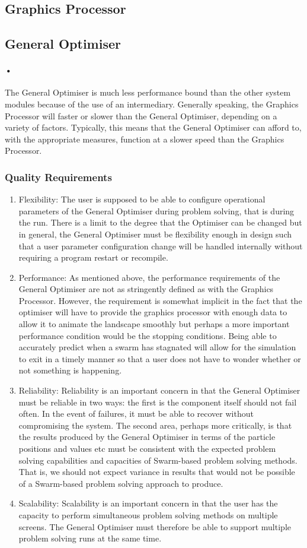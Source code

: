 \documentclass[11pt]{article}
\begin{document}
\subsection{Graphics Processor}
\subsection{General Optimiser}
\paragraph{•}
The General Optimiser is much less performance bound than the other system modules because of the use of an intermediary. Generally speaking, the Graphics Processor will faster or slower than the General Optimiser, depending on a variety of factors. Typically, this means that the General Optimiser can afford to, with the appropriate measures, function at a slower speed than the Graphics Processor.
\subsubsection{Quality Requirements}
\begin{enumerate}
\item Flexibility: The user is supposed to be able to configure operational parameters of the General Optimiser during problem solving, that is during the run. There is a limit to the degree that the Optimiser can be changed but in general, the General Optimiser must be flexibility enough in design such that a user parameter configuration change will be handled internally without requiring a program restart or recompile.
\item Performance: As mentioned above, the performance requirements of the General Optimiser are not as stringently defined as with the Graphics Processor. However, the requirement is somewhat implicit in the fact that the optimiser will have to provide the graphics processor with enough data to allow it to animate the landscape smoothly but perhaps a more important performance condition would be the stopping conditions. Being able to accurately predict when a swarm has stagnated will allow for the simulation to exit in a timely manner so that a user does not have to wonder whether or not something is happening.
\item Reliability: Reliability is an important concern in that the General Optimiser must be reliable in two ways: the first is the component itself should not fail often. In the event of failures, it must be able to recover without compromising the system. The second area, perhaps more critically, is that the results produced by the General Optimiser in terms of the particle positions and values etc must be consistent with the expected problem solving capabilities and capacities of Swarm-based problem solving methods. That is, we should not expect variance in results that would not be possible of a Swarm-based problem solving approach to produce.
\item Scalability: Scalability is an important concern in that the user has the capacity to perform simultaneous problem solving methods on multiple screens. The General Optimiser must therefore be able to support multiple problem solving runs at the same time.
\end{enumerate}
\end{document}
